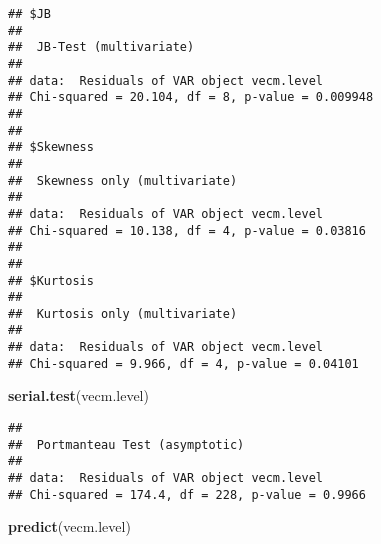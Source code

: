 \documentclass[]{book}
\newenvironment{Shaded}{\begin{snugshade}}{\end{snugshade}}
\newcommand{\KeywordTok}[1]{\textcolor[rgb]{0.13,0.29,0.53}{\textbf{#1}}}
\newcommand{\NormalTok}[1]{#1}
\theoremstyle{definition}
\theoremstyle{definition}
\theoremstyle{definition}
\theoremstyle{remark}
\begin{document}
\begin{verbatim}
## $JB
## 
##  JB-Test (multivariate)
## 
## data:  Residuals of VAR object vecm.level
## Chi-squared = 20.104, df = 8, p-value = 0.009948
## 
## 
## $Skewness
## 
##  Skewness only (multivariate)
## 
## data:  Residuals of VAR object vecm.level
## Chi-squared = 10.138, df = 4, p-value = 0.03816
## 
## 
## $Kurtosis
## 
##  Kurtosis only (multivariate)
## 
## data:  Residuals of VAR object vecm.level
## Chi-squared = 9.966, df = 4, p-value = 0.04101
\end{verbatim}

\begin{Shaded}
\begin{Highlighting}[]
\KeywordTok{serial.test}\NormalTok{(vecm.level)}
\end{Highlighting}
\end{Shaded}

\begin{verbatim}
## 
##  Portmanteau Test (asymptotic)
## 
## data:  Residuals of VAR object vecm.level
## Chi-squared = 174.4, df = 228, p-value = 0.9966
\end{verbatim}

\begin{Shaded}
\begin{Highlighting}[]
\KeywordTok{predict}\NormalTok{(vecm.level)}
\end{Highlighting}
\end{Shaded}
\end{document}
